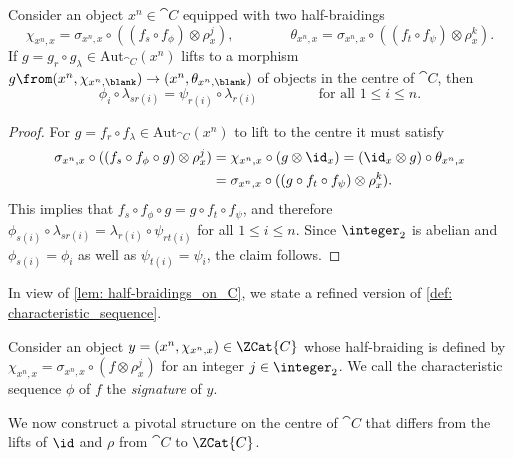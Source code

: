 \begin{corollary}\label{cor: criterion_lifting_automorphisms}
  Consider an object \(x^n\in \cat{C}\) equipped with two half-braidings
  \[
    \chi_{x^n, x} = \sigma_{x^n,x} \circ ((f_s \circ f_\phi)\otimes \rho_x^j), \qquad \qquad
    \theta_{x^n, x} =\sigma_{x^n,x} \circ ((f_t \circ f_\psi)\otimes \rho_x^k).
  \]
  If \(g= g_r \circ g_\lambda \in \mathrm{Aut}_{\cat{C}}(x^n)\) lifts to
  a morphism \(g \from (x^n, \chi_{x^n, \blank}) \to (x^n, \theta_{x^n, \blank})\) of objects in the centre of \(\cat{C}\),
  then
  \[
    \phi_{i}\circ\lambda_{sr(i)} = \psi_{r(i)}\circ\lambda_{r(i)} \qquad \qquad \text{ for all } 1 \leq i \leq n.
  \]
\end{corollary}
\begin{proof}
  For \(g = f_r \circ f_\lambda \in \mathrm{Aut}_{\cat{C}}(x^n)\) to lift to the centre it must satisfy
  \begin{align*}
    \sigma_{x^n,x} \circ ((f_s \circ f_\phi \circ g) \otimes \rho_x^j)
    & = \chi_{x^n,x} \circ (g \otimes \id_x)
      = (\id_x\otimes g) \circ \theta_{x^n, x} \\
    & = \sigma_{x^n,x} \circ ((g \circ f_t \circ f_\psi)\otimes \rho_x^k).
  \end{align*}
  This implies that \(f_s \circ f_\phi \circ g = g \circ f_t \circ f_\psi\),
  and therefore \(\phi_{s(i)} \circ \lambda_{sr(i)} = \lambda_{r(i)} \circ \psi_{rt(i)}\) for all \(1\leq i \leq n\).
  Since \(\integer_2\) is abelian and \(\phi_{s(i)}= \phi_i\) as well as \(\psi_{t(i)}= \psi_{i}\), the claim follows.
\end{proof}

In view of \cref{lem: half-braidings_on_C},
we state a refined version of \cref{def: characteristic_sequence}.

\begin{definition}\label{def: characteristic_sequence_of_half_braiding.}
  Consider an object \(y = (x^n, \chi_{x^n, x})\in \ZCat{C}\) whose half-braiding is defined by
  \(\chi_{x^n, x}= \sigma_{x^n,x} \circ (f\otimes \rho_x^j)\) for an integer \(j \in \integer_2\).
  We call the characteristic sequence \(\phi\) of \(f\) the \emph{signature} of \(y\).
\end{definition}

We now construct a pivotal structure on the centre of \(\cat{C}\)
that differs from the lifts of \(\id\) and \(\rho\) from \(\cat{C}\) to \(\ZCat{C}\).

